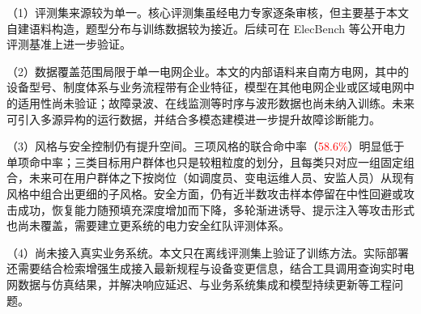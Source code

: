 \documentclass[fontset=fandol,type=master,campus=shenzhen,etitleauto=true]{hithesisbook}
\newcommand{\rev}[1]{\textcolor{red}{#1}}
\begin{document}
\begin{conclusions}
\noindent （1）评测集来源较为单一。核心评测集虽经电力专家逐条审核，但主要基于本文自建语料构造，题型分布与训练数据较为接近。后续可在 ElecBench\cite{ref21} 等公开电力评测基准上进一步验证。

\noindent （2）数据覆盖范围局限于单一电网企业。本文的内部语料来自南方电网，其中的设备型号、制度体系与业务流程带有企业特征，模型在其他电网企业或区域电网中的适用性尚未验证；故障录波、在线监测等时序与波形数据也尚未纳入训练。未来可引入多源异构的运行数据，并结合多模态建模进一步提升故障诊断能力。

\noindent （3）风格与安全控制仍有提升空间。三项风格的联合命中率（\rev{58.6\%}）明显低于单项命中率；三类目标用户群体也只是较粗粒度的划分，且每类只对应一组固定组合，未来可在用户群体之下按岗位（如调度员、变电运维人员、安监人员）从现有风格中组合出更细的子风格。安全方面，仍有近半数攻击样本停留在中性回避或攻击成功，恢复能力随预填充深度增加而下降，多轮渐进诱导、提示注入等攻击形式也尚未覆盖，需要建立更系统的电力安全红队评测体系。

\noindent （4）尚未接入真实业务系统。本文只在离线评测集上验证了训练方法。实际部署还需要结合检索增强生成接入最新规程与设备变更信息，结合工具调用查询实时电网数据与仿真结果，并解决响应延迟、与业务系统集成和模型持续更新等工程问题。

\end{conclusions}
\end{document}
